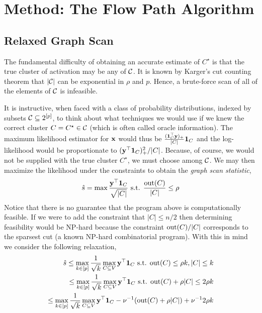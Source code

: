 \section{Method: The Flow Path Algorithm}

\subsection{Relaxed Graph Scan}

The fundamental difficulty of obtaining an accurate estimate of $C^\star$ is that the true cluster of activation may be any of $\mathcal{C}$.
It is known by Karger's cut counting theorem\cite{karger1996new} that $|\mathcal{C}|$ can be exponential in $\rho$ and $p$.
Hence, a brute-force scan of all of the elements of $\mathcal{C}$ is infeasible.

It is instructive, when faced with a class of probability distributions, indexed by subsets $\mathcal{C} \subseteq 2^{[p]}$, to think about what techniques we would use if we knew the correct cluster $C = C^\star \in \mathcal{C}$ (which is often called oracle information).
The maximum likelihood estimator for $\mathbf{x}$ would thus be $\frac{({\bf 1}_C^\top \mathbf{y})_+}{|C|} {\bf 1}_C$ and the log-likelihood would be proportionate to $(\mathbf{y}^\top {\bf 1}_C)_+^2 / |C|$.
Because, of course, we would not be supplied with the true cluster $C^\star$, we must choose among $\mathcal{C}$.
We may then maximize the likelihood under the constraints to obtain the {\em graph scan statistic},
\[
\hat s = \max \frac{\mathbf{y}^\top {\bf 1}_C}{\sqrt{|C|}} \textrm{ s.t. } \frac{\textrm{out}(C)}{|C|} \le \rho
\]
Notice that there is no guarantee that the program above is computationally feasible.
If we were to add the constraint that $|C| \le n/2$ then determining feasibility would be NP-hard because the constraint $\textrm{out}(C) / |C|$ corresponds to the sparsest cut (a known NP-hard combinatorial program).
With this in mind we consider the following relaxation,
\[
\begin{aligned}
\hat s \le \max_{k \in [p]} \frac{1}{\sqrt k} \max_{C \subseteq V} \mathbf{y}^\top {\bf 1}_C \textrm{ s.t. } \textrm{out}(C) \le \rho k, |C| \le k\\
\le \max_{k \in [p]} \frac{1}{\sqrt k} \max_{C \subseteq V} \mathbf{y}^\top {\bf 1}_C \textrm{ s.t. } \textrm{out}(C) + \rho |C| \le 2 \rho k\\
\le \max_{k \in [p]} \frac{1}{\sqrt k} \max_{C \subseteq V} \mathbf{y}^\top {\bf 1}_C - \nu^{-1}(\textrm{out}(C) + \rho |C|) + \nu^{-1} 2 \rho k\\
\end{aligned}
\]
